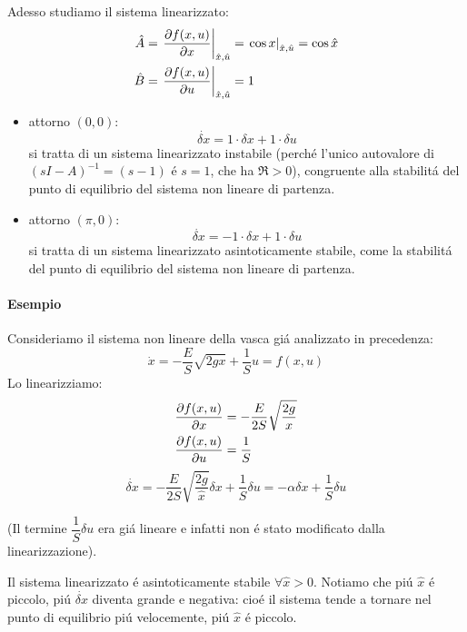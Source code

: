 \documentclass[../main.tex]{subfiles}
\begin{document}
\begin{mdframed}[style=Esempio]
			Adesso studiamo il sistema linearizzato:
			\[
				\begin{aligned}
					\hat A &= \left. \frac{\partial f(x,u)}{\partial x}\right|_{\hat x, \hat u} = \left. \cos x \right|_{\hat x, \hat u} = \cos \hat x
					\\
					\hat B &= \left. \frac{\partial f(x,u)}{\partial u}\right|_{\hat x, \hat u} = 1
				\end{aligned}
			\]
			\begin{itemize}
				\item
					attorno $ (0,0) $:
					\[
						\dot{\delta x} = 1 \cdot \delta x + 1 \cdot \delta u
					\]
					si tratta di un sistema linearizzato instabile (perch\'e l'unico autovalore di $ (sI-A)^{-1} = (s-1) $ \'e $ s = 1 $, che ha $ \Re > 0 $), congruente alla stabilit\'a del punto di equilibrio del sistema non lineare di partenza.
				\item
					attorno $ (\pi, 0) $:
					\[
						\dot{\delta x} = -1 \cdot \delta x + 1 \cdot \delta u
					\]
					si tratta di un sistema linearizzato asintoticamente stabile, come la stabilit\'a del punto di equilibrio del sistema non lineare di partenza.
			\end{itemize}
		\end{mdframed}
	
		\begin{mdframed}[style=Esempio]
			\paragraph{Esempio}
			Consideriamo il sistema non lineare della vasca gi\'a analizzato in precedenza:
			\[
				\dot x = - \dfrac{E}{S} \sqrt{2gx} + \dfrac{1}{S} u = f(x,u)
			\]
			Lo linearizziamo:
			\[
				\begin{aligned}
					\frac{\partial f(x,u)}{\partial x} &= -\dfrac{E}{2S} \sqrt{\dfrac{2g}{x}}
					\\
					\frac{\partial f(x,u)}{\partial u} &= \dfrac{1}{S}
				\end{aligned}
			\]
			\[
				\dot{\delta x} = -\dfrac{E}{2S} \sqrt{\dfrac{2g}{\hat x}} \delta x + \dfrac{1}{S} \delta u  = - \alpha \delta x + \dfrac{1}{S} \delta u
			\]
			
			(Il termine $ \dfrac{1}{S} \delta u $ era gi\'a lineare e infatti non \'e stato modificato dalla linearizzazione).
			
			Il sistema linearizzato \'e asintoticamente stabile $ \forall \hat x > 0 $. Notiamo che pi\'u $ \hat x $ \'e piccolo, pi\'u $ \dot{\delta x} $ diventa grande e negativa: cio\'e il sistema tende a tornare nel punto di equilibrio pi\'u velocemente, pi\'u $ \hat x $ \'e piccolo.
		\end{mdframed}
		
\end{document}
